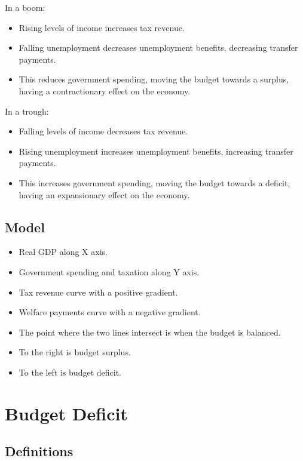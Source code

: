 \documentclass[a4paper,11pt]{article}
\begin{document}
In a boom:

\begin{itemize}
\item Rising levels of income increases tax revenue.
\item Falling unemployment decreases unemployment benefits, decreasing transfer
	payments.
\item This reduces government spending, moving the budget towards a surplus,
	having a contractionary effect on the economy.
\end{itemize}

In a trough:

\begin{itemize}
\item Falling levels of income decreases tax revenue.
\item Rising unemployment increases unemployment benefits, increasing transfer
	payments.
\item This increases government spending, moving the budget towards a deficit,
	having an expansionary effect on the economy.
\end{itemize}


\subsection{Model}

\begin{itemize}
\item Real GDP along X axis.
\item Government spending and taxation along Y axis.
\item Tax revenue curve with a positive gradient.
\item Welfare payments curve with a negative gradient.
\item The point where the two lines intersect is when the budget is balanced.
\item To the right is budget surplus.
\item To the left is budget deficit.
\end{itemize}



\section{Budget Deficit}

\subsection{Definitions}
\end{document}
